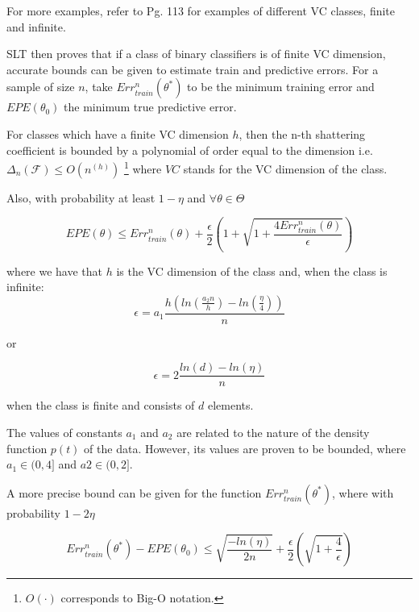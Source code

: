For more examples, refer to \cite{cherkassky-learning2007} Pg. 113 for examples of different VC classes, finite and infinite.

SLT then proves that if a class of binary classifiers is of finite VC dimension, accurate bounds can be given to estimate train and predictive errors. For a sample of size $n$, take $Err^n_{train}(\theta^*)$ to be the minimum training error and $EPE(\theta_0)$ the minimum true predictive error. 

For classes which have a finite VC dimension $h$, then the n-th shattering coefficient is bounded by a polynomial of order equal to the dimension 
i.e. $\Delta_n(\mathcal {F}) \leq O(n^(h))$ \footnote{$O(\cdot)$ corresponds to Big-O notation.} where $VC$ stands for the VC dimension of the class.

Also, with probability at least $1 - \eta$ and $\forall \theta \in \Theta$

\begin{equation}\label{vapnik-classificationBound}
EPE(\theta) \leq  Err^n_{train}(\theta) + \frac{\epsilon}{2} \left(1 + \sqrt{1 + \frac{4 Err^n_{train}(\theta)  }{\epsilon}}  \right)    
\end{equation}

where we have that $h$ is the VC dimension of the class and, when the class is infinite: 
\begin{equation}\label{vapnik-epsilonBound}
\epsilon = a_1 \frac{h \left( ln(\frac{a_2 n}{h} ) -  ln(\frac{\eta}{4} ) \right)}{n}
\end{equation}

or 

\begin{equation}\label{vapnik-epsilonBound}
\epsilon = 2 \frac{ ln(d) - ln(\eta)}{n}
\end{equation}

when the class is finite and consists of $d$ elements.

The values of constants $a_1$ and $a_2$ are related to the nature of the density function $p(t)$ of the data. However, its values are proven to be bounded, where $a_1 \in (0,4 ]$ and $a2 \in (0,2 ]$. 


A more precise bound can be given for the function $Err^n_{train}(\theta^*)$, where with probability $1 - 2\eta$ 

\begin{equation}\label{vapnik-classificationBoundPrecise}
Err^n_{train}(\theta^*) - EPE(\theta_0) \leq  \sqrt{\frac{-ln(\eta)}{2n} } + \frac{\epsilon}{2}\left( \sqrt{1 + \frac{4}{\epsilon} } \right)
\end{equation}